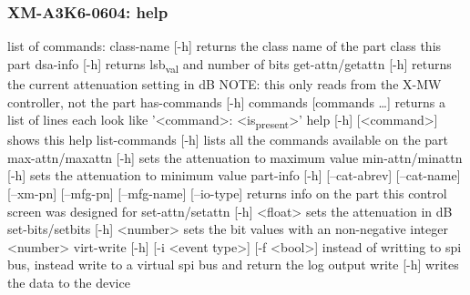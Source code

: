 \documentclass[11pt]{article}
\begin{document}
\subsubsection{XM-A3K6-0604: help}
\label{sec:org7e61331}
list of commands:
  class-name [-h]
    returns the class name of the part class this part
  dsa-info [-h]
    returns lsb\textsubscript{val} and number of bits
  get-attn/getattn [-h]
    returns the current attenuation setting in dB
    NOTE: this only reads from the X-MW controller, not the part
  has-commands [-h] commands [commands \ldots{}]
    returns a list of lines each look like '<command>: <is\textsubscript{present}>'
  help [-h] [<command>]
    shows this help
  list-commands [-h]
    lists all the commands available on the part
  max-attn/maxattn [-h]
    sets the attenuation to maximum value
  min-attn/minattn [-h]
    sets the attenuation to minimum value
  part-info  [-h] [--cat-abrev] [--cat-name] [--xm-pn] [--mfg-pn] [--mfg-name]
          [--io-type]
    returns info on the part this control screen was designed for
  set-attn/setattn [-h] <float>
    sets the attenuation in dB
  set-bits/setbits [-h] <number>
    sets the bit values with an non-negative integer <number>
  virt-write [-h] [-i <event type>] [-f <bool>]
    instead of writting to spi bus, instead write to a virtual spi bus
    and return the log output
  write [-h]
    writes the data to the device
\end{document}
